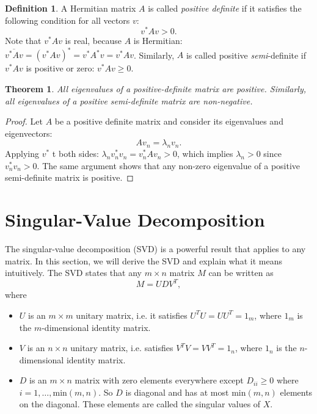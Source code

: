 \documentclass{article}
\newtheorem{theorem}{Theorem}[section]
\theoremstyle{definition}
\newtheorem{definition}{Definition}[section]
\begin{document}
\begin{definition}
\label{linalg-def:pos-def}
A Hermitian matrix $A$ is called \textit{positive definite} if it satisfies the following condition for all vectors $v$:
\begin{equation}
    v^*Av > 0.
\end{equation}
Note that $v^*Av$ is real, because $A$ is Hermitian: $\overline{v^*Av}=(v^*Av)^*=v^*A^*v=v^*Av$. Similarly, $A$ is called positive \textit{semi}-definite if $v^*Av$ is positive or zero: $v^*Av \ge 0$.
\end{definition}

\begin{theorem}
\label{linalg-def:pos-def-eig}
All eigenvalues of a positive-definite matrix are positive. Similarly, all eigenvalues of a positive semi-definite matrix are non-negative.
\end{theorem}

\begin{proof}
Let $A$ be a positive definite matrix and consider its eigenvalues and eigenvectors:
\begin{equation}
    Av_n=\lambda_nv_n.
\end{equation}
Applying $v^*$ t both sides: $\lambda_nv_n^*v_n=v_n^*Av_n > 0$, which implies $\lambda_n > 0$ since $v_n^*v_n>0$. The same argument shows that any non-zero eigenvalue of a positive semi-definite matrix is positive.
\end{proof}

\section{Singular-Value Decomposition}
\label{section:svd}
The singular-value decomposition (SVD) is a powerful result that applies to any matrix. In this section, we will derive the SVD and explain what it means intuitively. The SVD states that any $m\times n$ matrix $M$ can be written as
\begin{equation}
    M=UDV^T,
\end{equation}
where
\begin{itemize}
    \item $U$ is an $m\times m$ unitary matrix, i.e. it satisfies $U^TU=UU^T=1_m$, where $1_m$ is the $m$-dimensional identity matrix.
    \item $V$ is an $n\times n$ unitary matrix, i.e. satisfies $V^TV=VV^T=1_n$, where $1_n$ is the $n$-dimensional identity matrix.
    \item $D$ is an $m\times n$ matrix with zero elements everywhere except $D_{ii}\ge0$ where $i=1,\dots,\text{min}(m, n)$. So $D$ is diagonal and has at most $\text{min}(m, n)$ elements on the diagonal. These elements are called the singular values of $X$.
\end{itemize}
\end{document}
